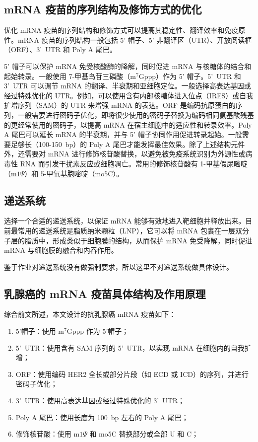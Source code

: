 \documentclass{ctexart}
\begin{document}
    \subsection{mRNA 疫苗的序列结构及修饰方式的优化}
    优化 mRNA 疫苗的序列结构和修饰方式可以提高其稳定性、翻译效率和免疫原性。mRNA 疫苗的序列结构一般包括 5' 帽子、5' 非翻译区（UTR）、开放阅读框（ORF）、3'~UTR 和 Poly A 尾巴\textsuperscript{\cite{ref4}}。

    5' 帽子可以保护 mRNA 免受核酸酶的降解，同时促进 mRNA 与核糖体的结合和起始转录。一般使用 7-甲基鸟苷三磷酸（$\mathrm{m^{7}Gppp}$）作为 5' 帽子。5'~UTR 和 3'~UTR 可以调节 mRNA 的翻译、半衰期和亚细胞定位。一般选择高表达基因或经过特殊优化的 UTR\textsuperscript{\cite{ref4}}。例如，可以使用含有内部核糖体进入位点（IRES）或自我扩增序列（SAM）的 UTR 来增强 mRNA 的表达。ORF 是编码抗原蛋白的序列，一般需要进行密码子优化，即将很少使用的密码子替换为编码相同氨基酸残基的更经常使用的密码子，以提高 mRNA 在宿主细胞中的适应性和转录效率\textsuperscript{\cite{ref4}}。Poly A 尾巴可以延长 mRNA 的半衰期，并与 5' 帽子协同作用促进转录起始。一般需要足够长（100-150~bp）的 Poly A 尾巴才能发挥最佳效果。除了上述结构元件外，还需要对 mRNA 进行修饰核苷酸替换，以避免被免疫系统识别为外源性或病毒性 RNA 而引发干扰素反应或细胞凋亡。常用的修饰核苷酸有 1-甲基假尿嘧啶（$\mathrm{m}1\Psi$）和 5-甲氧基胞嘧啶（mo5C）\textsuperscript{\cite{ref5}}。

    \subsection{递送系统}
    选择一个合适的递送系统，以保证 mRNA 能够有效地进入靶细胞并释放出来。目前最常用的递送系统是脂质纳米颗粒（LNP），它可以将 mRNA 包裹在一层双分子层的脂质中，形成类似于细胞膜的结构，从而保护 mRNA 免受降解，同时促进 mRNA 与细胞膜的融合和内吞作用。

    鉴于作业对递送系统没有做强制要求，所以这里不对递送系统做具体设计。
    
    \subsection{乳腺癌的 mRNA 疫苗具体结构及作用原理}
    综合前文所述，本文设计的抗乳腺癌 mRNA 疫苗如下：
    \begin{enumerate}
        \item 5'帽子：使用 $\mathrm{m^{7}Gppp}$ 作为 5'帽子；
        \item 5'~UTR：使用含有 SAM 序列的 5'~UTR，以实现 mRNA 在细胞内的自我扩增；
        \item ORF：使用编码 HER2 全长或部分片段（如 ECD 或 ICD）的序列，并进行密码子优化；
        \item 3'~UTR：使用高表达基因或经过特殊优化的 3'~UTR；
        \item Poly A 尾巴：使用长度为 100~bp 左右的 Poly A 尾巴；
        \item 修饰核苷酸：使用 $\mathrm{m}1\Psi$ 和 mo5C 替换部分或全部 U 和 C；
    \end{enumerate}    
\end{document}
